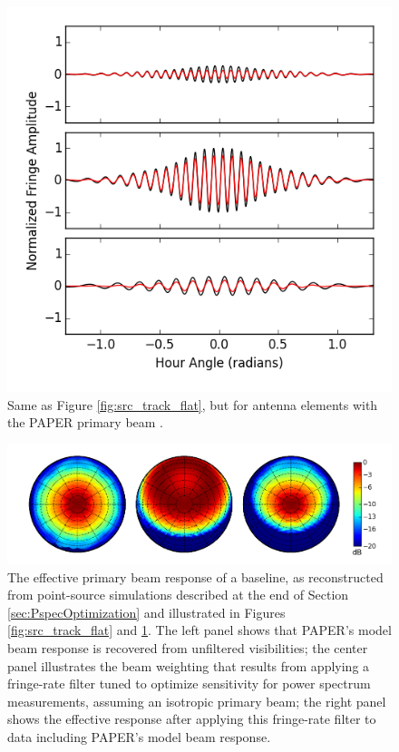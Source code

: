 \documentclass[twocolumn,apj,numberedappendix]{emulateapj}
\begin{document}
\begin{figure}\centering
\includegraphics[width=0.9\columnwidth]{plots/src_track_beam.png}
\caption{
Same as Figure \ref{fig:src_track_flat}, but for antenna elements
with the PAPER primary beam \citep{parsons_et_al2010,pober_et_al2012}.
}\label{fig:src_track_beam}
\end{figure}

\begin{figure}\centering
\includegraphics[width=1.9\columnwidth]{plots/eff_beam.png}
\caption{
The effective primary beam response of a baseline, as reconstructed from point-source simulations 
described at the end of Section \ref{sec:PspecOptimization} and illustrated in Figures \ref{fig:src_track_flat} and
\ref{fig:src_track_beam}. 
The left panel shows that PAPER's model beam response is recovered from unfiltered
visibilities; the center panel illustrates the
beam weighting that results from applying a fringe-rate filter tuned to optimize sensitivity
for power spectrum measurements, assuming an isotropic primary beam; the right panel
shows the effective response after applying this fringe-rate filter to data including PAPER's model beam response.
}\label{fig:eff_beam}
\end{figure}
\end{document}
